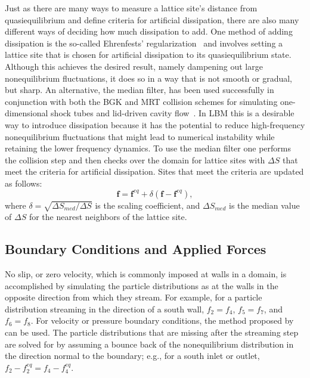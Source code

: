 Just as there are many ways to measure a lattice site's distance from quasiequilibrium and define criteria for artificial dissipation, there are also many different ways of deciding how much dissipation to add.
One method of adding dissipation is the so-called Ehrenfests' regularization~\cite{brownlee2006stabilization} and involves setting a lattice site that is chosen for artificial dissipation to its quasiequilibrium state.
Although this achieves the desired result, namely dampening out large nonequilibrium fluctuations, it does so in a way that is not smooth or gradual, but sharp.
An alternative, the median filter, has been used successfully in conjunction with both the BGK and MRT collision schemes for simulating one-dimensional shock tubes and lid-driven cavity flow~\cite{brownlee2008nonequilibrium,gorban2014enhancement,packwood2009entropy}.
In LBM this is a desirable way to introduce dissipation because it has the potential to reduce high-frequency nonequilibrium fluctuations that might lead to numerical instability while retaining the lower frequency dynamics.
To use the median filter one performs the collision step and then checks over the domain for lattice sites with $\Delta S$ that meet the criteria for artificial dissipation.
Sites that meet the criteria are updated as follows:
\begin{equation} \label{eq:median-filter}
\mathbf{f} = \mathbf{f}^{eq} + \delta (\mathbf{f} - \mathbf{f}^{eq}),
\end{equation}
\noindent where $\delta = \sqrt{\Delta S_{med} / \Delta S}$ is the scaling coefficient, and $\Delta S_{med}$ is the median value of $\Delta S$ for the nearest neighbors of the lattice site.

\subsection{Boundary Conditions and Applied Forces} \label{sec:bcs}

No slip, or zero velocity, which is commonly imposed at walls in a domain, is accomplished by simulating the particle distributions as \DIFdelbegin {}\DIFdelend \DIFaddbegin {}\DIFaddend at the walls in the opposite direction from which they stream.
For example, for a particle distribution streaming in the direction of a south wall, $f_2 = f_4$, $f_5 = f_7$, and $f_6 = f_8$.
\DIFaddbegin {}\emph{} \DIFaddend For velocity or pressure boundary conditions, the method proposed by~\citet{zou1997pressure} can be used.
The particle distributions that are missing after the streaming step are solved for by assuming a bounce back of the nonequilibrium distribution in the direction normal to the boundary; e.g., for a south inlet or outlet, $f_2 - f_2^{eq} = f_4 - f_4^{eq}$.

